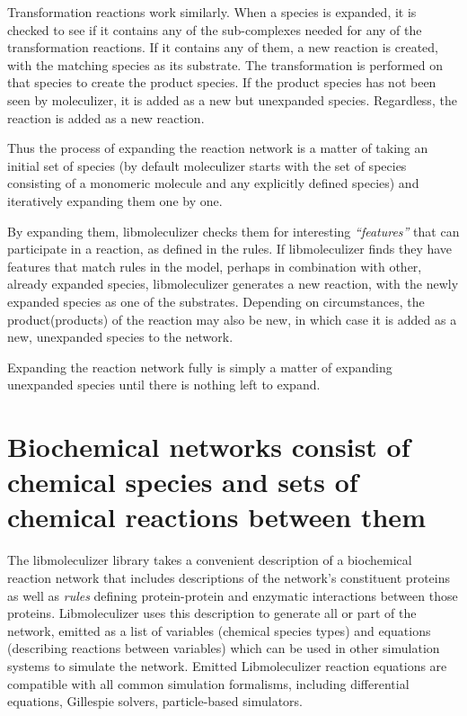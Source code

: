 Transformation reactions work similarly.  When a species is expanded,
it is checked to see if it contains any of the sub-complexes needed for
any of the transformation reactions.  If it contains any of them, a
new reaction is created, with the matching species as its substrate.
The transformation is performed on that species to create the product
species.  If the product species has not been seen by moleculizer, it
is added as a new but unexpanded species.  Regardless, the reaction is
added as a new reaction.  

Thus the process of expanding the reaction network is a matter of
taking an initial set of species (by default moleculizer starts with
the set of species consisting of a monomeric molecule and any
explicitly defined species)  and iteratively expanding them one by
one.  

By expanding them, libmoleculizer checks them for interesting
{\it ``features''} that can participate in a reaction, as defined in the
rules.  If libmoleculizer finds they have features that match rules in
the model, perhaps in combination with other, already expanded
species, libmoleculizer generates a new reaction, with the newly
expanded species as one of the substrates.  Depending on
circumstances, the product(products) of the reaction may also be new, in 
which case it is added as a new, unexpanded species to the network.  

Expanding the reaction network fully is simply a matter of expanding
unexpanded species until there is nothing left to expand.  


\section{Biochemical networks consist of chemical species and sets of
  chemical reactions between them}

The libmoleculizer library takes a convenient description of a
biochemical reaction network that includes descriptions of the
network's constituent proteins as well as {\it rules} defining
protein-protein and enzymatic interactions between those proteins.
Libmoleculizer uses this description to generate all or part of the
network, emitted as a list of variables (chemical species types) and
equations (describing reactions between variables) which can be used
in other simulation systems to simulate the network.  Emitted
Libmoleculizer reaction equations are compatible with all common
simulation formalisms, including differential equations, Gillespie
solvers, particle-based simulators.

